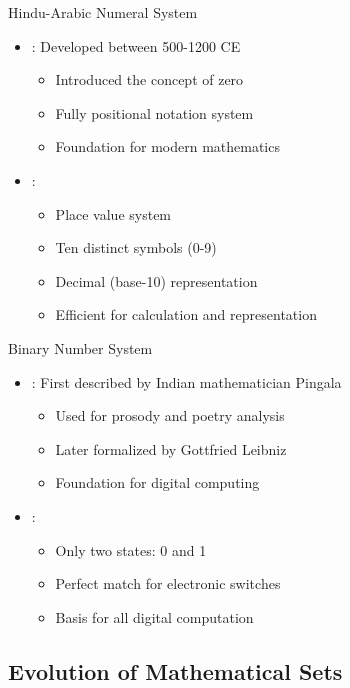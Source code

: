 \begin{frame}{Hindu-Arabic Numeral System}
\begin{itemize}
\item {}: Developed between 500-1200 CE
\begin{itemize}
\item Introduced the concept of zero
\item Fully positional notation system
\item Foundation for modern mathematics
\end{itemize}
\vspace{0.5cm}
\item {}:
\begin{itemize}
\item Place value system
\item Ten distinct symbols (0-9)
\item Decimal (base-10) representation
\item Efficient for calculation and representation
\end{itemize}
\end{itemize}
\end{frame}

\begin{frame}{Binary Number System}
\begin{itemize}
\item {}: First described by Indian mathematician Pingala
\begin{itemize}
\item Used for prosody and poetry analysis
\item Later formalized by Gottfried Leibniz
\item Foundation for digital computing
\end{itemize}
\vspace{0.5cm}
\item {}: 
\begin{itemize}
\item Only two states: 0 and 1
\item Perfect match for electronic switches
\item Basis for all digital computation
\end{itemize}
\end{itemize}
\end{frame}

\subsection{Evolution of Mathematical Sets}

